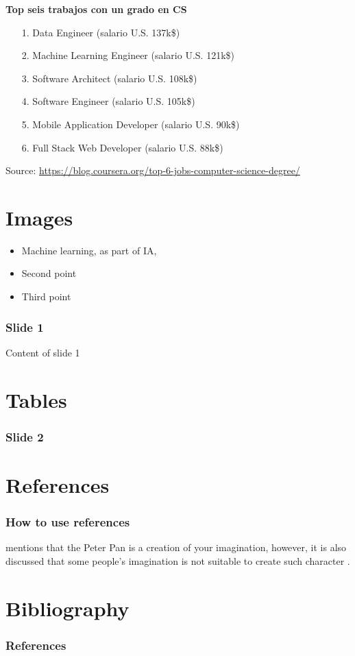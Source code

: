 \documentclass[english,svgnames,notes=hide,12pt]{beamer}
\begin{document}
\begin{frame}
    \textbf{Top seis trabajos con un grado en CS}
    \begin{itemize}
        \item[\small{1.}] Data Engineer (salario U.S. 137k\$)
        \item[\small{2.}] Machine Learning Engineer (salario U.S. 121k\$)
        \item[\small{3.}] Software Architect (salario U.S. 108k\$)
        \item[\small{4.}] Software Engineer (salario U.S. 105k\$)
        \item[\small{5.}] Mobile Application Developer (salario U.S. 90k\$)
        \item[\small{6.}] Full Stack Web Developer (salario U.S. 88k\$)
    \end{itemize}

    \tiny{Source: \url{https://blog.coursera.org/top-6-jobs-computer-science-degree/}}
\end{frame}


\section{Images}
\begin{frame}
\begin{itemize}[<+->]

    \item Machine learning, as part of IA,
    \item Second point
    \item Third point
\end{itemize}
	\frametitle{Slide 1}
	Content of slide 1
\end{frame}

\section{Tables}
\begin{frame}
	\frametitle{Slide 2}
\end{frame}

\section{References}
\begin{frame}
    \frametitle{How to use references}
     mentions that the Peter Pan is a creation of your imagination, however, it is also discussed that some people's imagination is not suitable to create such character .
\end{frame}

\section*{Bibliography}
\begin{frame}[allowframebreaks]
    \frametitle{References}
    \fontsize{5pt}{6.2}\selectfont
    
    \renewcommand{\bibliographytypesize}{\small}
    
\end{frame}
\end{document}
